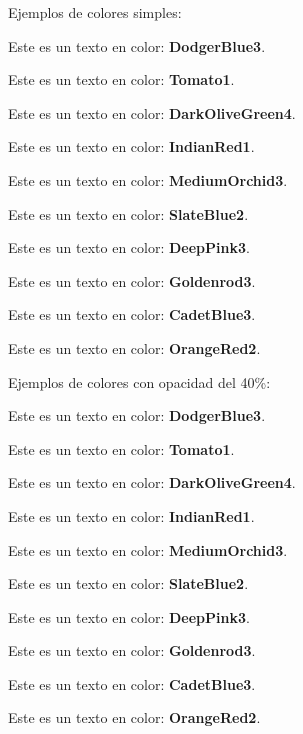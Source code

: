 \documentclass[preview]{standalone}
\begin{document}
Ejemplos de colores simples:

\textcolor{DodgerBlue3}{Este es un texto en color: \textbf{DodgerBlue3}.}

\textcolor{Tomato1}{Este es un texto en color: \textbf{Tomato1}.}

\textcolor{DarkOliveGreen4}{Este es un texto en color: \textbf{DarkOliveGreen4}.}

\textcolor{IndianRed1}{Este es un texto en color: \textbf{IndianRed1}.}

\textcolor{MediumOrchid3}{Este es un texto en color: \textbf{MediumOrchid3}.}

\textcolor{SlateBlue2}{Este es un texto en color: \textbf{SlateBlue2}.}

\textcolor{DeepPink3}{Este es un texto en color: \textbf{DeepPink3}.}

\textcolor{Goldenrod3}{Este es un texto en color: \textbf{Goldenrod3}.}

\textcolor{CadetBlue3}{Este es un texto en color: \textbf{CadetBlue3}.}

\textcolor{OrangeRed2}{Este es un texto en color: \textbf{OrangeRed2}.} \vspace{.5cm}

Ejemplos de colores con opacidad del 40\%:

\textcolor{DodgerBlue3!40}{Este es un texto en color: \textbf{DodgerBlue3}.}

\textcolor{Tomato1!40}{Este es un texto en color: \textbf{Tomato1}.}

\textcolor{DarkOliveGreen4!40}{Este es un texto en color: \textbf{DarkOliveGreen4}.}

\textcolor{IndianRed1!40}{Este es un texto en color: \textbf{IndianRed1}.}

\textcolor{MediumOrchid3!40}{Este es un texto en color: \textbf{MediumOrchid3}.}

\textcolor{SlateBlue2!40}{Este es un texto en color: \textbf{SlateBlue2}.}

\textcolor{DeepPink3!40}{Este es un texto en color: \textbf{DeepPink3}.}

\textcolor{Goldenrod3!40}{Este es un texto en color: \textbf{Goldenrod3}.}

\textcolor{CadetBlue3!40}{Este es un texto en color: \textbf{CadetBlue3}.}

\textcolor{OrangeRed2!40}{Este es un texto en color: \textbf{OrangeRed2}.}
\end{document}
